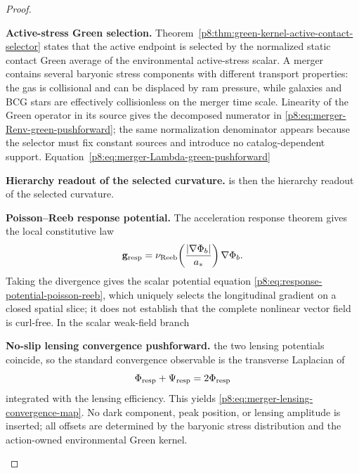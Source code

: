 \documentclass[12pt,a4paper]{article}
\begin{document}
\begin{proof}
\begin{proofsteps}
\item \textbf{Active-stress Green selection.}
Theorem~\ref{p8:thm:green-kernel-active-contact-selector} states that the active
endpoint is selected by the normalized static contact Green average of the
environmental active-stress scalar.  A merger contains several baryonic stress
components with different transport properties: the gas is collisional and can
be displaced by ram pressure, while galaxies and BCG stars are effectively
collisionless on the merger time scale.  Linearity of the Green operator in its
source gives the decomposed numerator in
\eqref{p8:eq:merger-Renv-green-pushforward}; the same normalization denominator
appears because the selector must fix constant sources and introduce no
catalog-dependent support.  Equation~\eqref{p8:eq:merger-Lambda-green-pushforward}

\item \textbf{Hierarchy readout of the selected curvature.}
is then the hierarchy readout of the selected curvature.

\item \textbf{Poisson--Reeb response potential.}
The acceleration response theorem gives the local constitutive law
\[
  \mathbf g_{\rm resp}
  =
  \nu_{\rm Reeb}\!\left(\frac{|\nabla\Phi_b|}{a_*}\right)\nabla\Phi_b .
\]
Taking the divergence gives the scalar potential equation
\eqref{p8:eq:response-potential-poisson-reeb}, which uniquely selects the longitudinal gradient on a closed spatial slice; it does not establish that the complete nonlinear vector field is curl-free.  In the scalar weak-field branch

\item \textbf{No-slip lensing convergence pushforward.}
the two lensing potentials coincide, so the standard convergence observable is
the transverse Laplacian of
\[
  \Phi_{\rm resp}+\Psi_{\rm resp}=2\Phi_{\rm resp}
\]
integrated with the lensing efficiency.  This yields
\eqref{p8:eq:merger-lensing-convergence-map}.  No dark component, peak position,
or lensing amplitude is inserted; all offsets are determined by the baryonic
stress distribution and the action-owned environmental Green kernel.
\end{proofsteps}
\end{proof}
\end{document}
